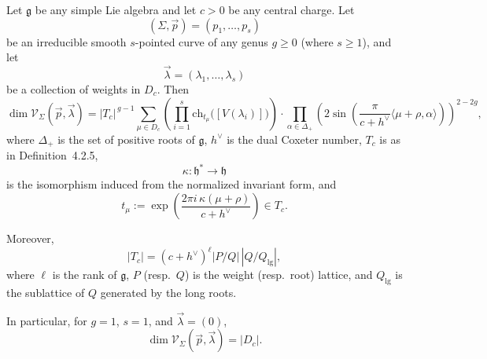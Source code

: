 \documentclass[12pt]{article}
\begin{document}
\begin{theorem}
Let $\mathfrak g$ be any simple Lie algebra and let $c>0$ be any central charge. Let
\[
(\Sigma,\vec p)=(p_1,\dots,p_s)
\]
be an irreducible smooth $s$-pointed curve of any genus $g\ge 0$ (where $s\ge 1$), and let
\[
\vec\lambda=(\lambda_1,\dots,\lambda_s)
\]
be a collection of weights in $D_c$. Then
\begin{equation*}
\dim \mathcal V_\Sigma(\vec p,\vec\lambda)
=
|T_c|^{\,g-1}
\sum_{\mu\in D_c}
\left(
\prod_{i=1}^s \mathrm{ch}_{t_\mu}\bigl([V(\lambda_i)]\bigr)
\right)
\cdot
\prod_{\alpha\in \Delta_+}
\left(
2\sin\left(\frac{\pi}{c+h^\vee}\langle \mu+\rho,\alpha\rangle\right)
\right)^{2-2g},
\end{equation*}
where $\Delta_+$ is the set of positive roots of $\mathfrak g$, $h^\vee$ is the dual Coxeter number,
$T_c$ is as in Definition~4.2.5,
\[
\kappa:\mathfrak h^*\to \mathfrak h
\]
is the isomorphism induced from the normalized invariant form, and
\[
t_\mu:=\exp\left(\frac{2\pi i\,\kappa(\mu+\rho)}{c+h^\vee}\right)\in T_c.
\]

Moreover,
\begin{equation}
|T_c|=(c+h^\vee)^\ell |P/Q|\,|Q/Q_{\mathrm{lg}}|,
\end{equation}
where $\ell$ is the rank of $\mathfrak g$, $P$ (resp.\ $Q$) is the weight (resp.\ root) lattice, and $Q_{\mathrm{lg}}$ is the sublattice of $Q$ generated by the long roots.

In particular, for $g=1$, $s=1$, and $\vec\lambda=(0)$,
\[
\dim \mathcal V_\Sigma(\vec p,\vec\lambda)=|D_c|.
\]
\end{theorem}
\end{document}
